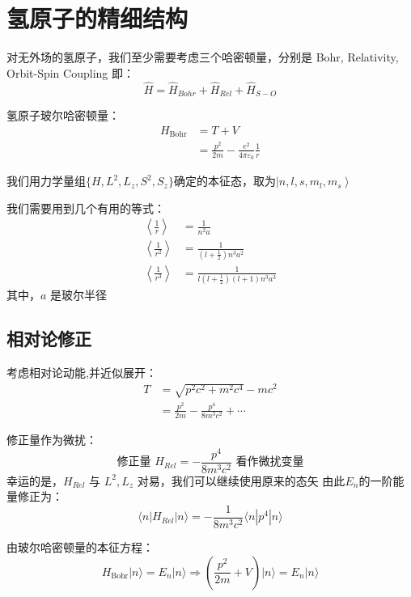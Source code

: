 \section{氢原子的精细结构}
对无外场的氢原子，我们至少需要考虑三个哈密顿量，分别是 Bohr, Relativity, Orbit-Spin Coupling 即：
\[\hat H = \hat H_{Bohr} + \hat H_{Rel} + \hat H_{S-O}\]

氢原子玻尔哈密顿量：
\begin{equation*}
	\begin{aligned}
		H_{\text{Bohr}} &= T + V \\
		&= \frac{{{p^2}}}{{2m}} - \frac{e^{2}}{4\pi\varepsilon_{0}}\frac{1}{r}
	\end{aligned}
\end{equation*}

我们用力学量组\(\{ H,{L^2},{L_z},S^2,S_z\} \)确定的本征态，取为$ \left| {n,l,s,m_l,m_s} \right\rangle $

我们需要用到几个有用的等式：
\[\boxed{
	\begin{aligned}
		\left\langle \frac{1}{r} \right\rangle &= \frac{1}{n^{2}a} \\
		\left\langle \frac{1}{r^{2}} \right\rangle 
		&= \frac{1}{\left(l+\frac{1}{2}\right) n^{3} a^{2}} \\
		\left\langle \frac{1}{r^{3}} \right\rangle 
		&= \frac{1}{l\left(l+\frac{1}{2}\right)(l+1) n^{3} a^{3}}
	\end{aligned}
}
\]
其中，\(a\) 是玻尔半径
\subsection{相对论修正}
考虑相对论动能,并近似展开：
\begin{equation*}
	\begin{aligned}
		T &= \sqrt{p^2c^2 + m^2c^4} - mc^2 \\
		&= \frac{p^2}{2m} - \frac{p^4}{8m^3c^2} + \cdots
	\end{aligned}
\end{equation*}

修正量作为微扰：
\[
\text{修正量 } H_{Rel} = -\frac{p^{4}}{8m^{3}c^{2}} \text{ 看作微扰变量}
\]
幸运的是，$H_{Rel}$ 与 ${L^2},{L_z}$ 对易，我们可以继续使用原来的态矢
由此${E_n}$的一阶能量修正为：
\[
\langle n | H_{Rel} | n \rangle = -\frac{1}{8m^{3}c^{2}} \langle n | p^{4} | n \rangle
\]

由玻尔哈密顿量的本征方程：
\[
H_{\text{Bohr}} | n \rangle = E_{n} | n \rangle \Rightarrow \left( \frac{p^{2}}{2m} + V \right) | n \rangle = E_{n} | n \rangle
\]

